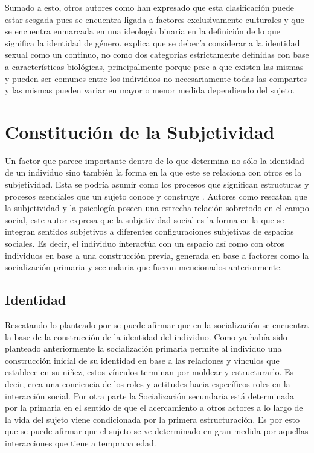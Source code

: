 Sumado a esto, otros autores como \textcite{Hernandez2010} han expresado que
esta clasificación puede estar sesgada pues se encuentra ligada a factores
exclusivamente culturales y que se encuentra enmarcada en una ideología binaria
en la definición de lo que significa la identidad de género.
\textcite{Vargas2017} explica que se debería considerar a la identidad sexual
como un continuo, no como dos categorías estrictamente definidas con base a
características biológicas, principalmente porque pese a que existen las mismas
y pueden ser comunes entre los individuos no necesariamente todas las compartes
y las mismas pueden variar en mayor o menor medida dependiendo del sujeto.

\section{Constitución de la Subjetividad}

Un factor que parece importante dentro de lo que determina no sólo la identidad
de un individuo sino también la forma en la que este se relaciona con otros es
la subjetividad. Esta se podría asumir
 como los procesos que significan estructuras y procesos esenciales
que un sujeto conoce y construye \parencite{Duesing2002}.  Autores como
 \textcite{Gonzalez2013}
rescatan que la subjetividad y la psicología poseen una estrecha relación
sobretodo en el campo social, este autor expresa que la subjetividad social es
la forma en la que se integran sentidos subjetivos a diferentes configuraciones
subjetivas de espacios sociales. Es decir, el individuo interactúa con un
espacio así como con otros individuos en base a una construcción previa,
generada en base a factores como la socialización primaria y secundaria que
fueron mencionados anteriormente.

\subsection{Identidad}

Rescatando lo planteado por \textcite{Berger1991} se puede afirmar que en la
socialización se encuentra la base de la construcción de la identidad del
individuo. Como ya había sido planteado anteriormente la socialización primaria
permite al individuo una construcción inicial de su identidad en base a las
relaciones y vínculos que establece en su niñez, estos vínculos terminan por
moldear y estructurarlo. Es decir, crea una conciencia de los roles y actitudes
hacia específicos roles en la interacción social. Por otra parte la
Socialización secundaria está determinada por la primaria en el sentido de que
el acercamiento a otros actores a lo largo de la vida del sujeto viene
condicionada por la primera estructuración. Es por esto que se puede afirmar que
el sujeto se ve determinado en gran medida por aquellas interacciones que tiene
a temprana edad.

